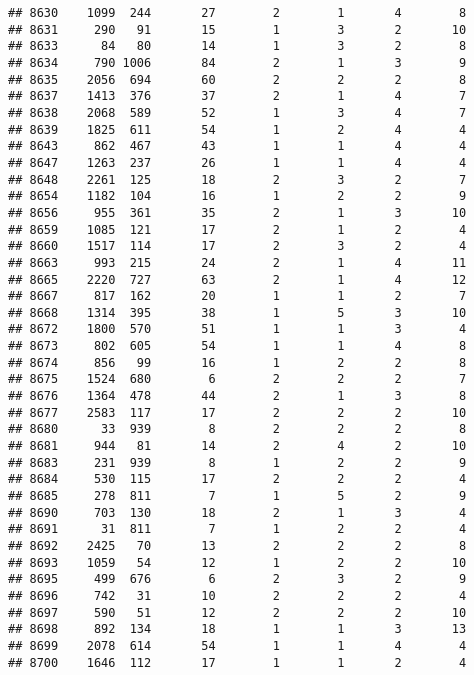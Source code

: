 \documentclass[]{article}
\begin{document}
\begin{verbatim}
## 8630    1099  244       27        2        1       4        8
## 8631     290   91       15        1        3       2       10
## 8633      84   80       14        1        3       2        8
## 8634     790 1006       84        2        1       3        9
## 8635    2056  694       60        2        2       2        8
## 8637    1413  376       37        2        1       4        7
## 8638    2068  589       52        1        3       4        7
## 8639    1825  611       54        1        2       4        4
## 8643     862  467       43        1        1       4        4
## 8647    1263  237       26        1        1       4        4
## 8648    2261  125       18        2        3       2        7
## 8654    1182  104       16        1        2       2        9
## 8656     955  361       35        2        1       3       10
## 8659    1085  121       17        2        1       2        4
## 8660    1517  114       17        2        3       2        4
## 8663     993  215       24        2        1       4       11
## 8665    2220  727       63        2        1       4       12
## 8667     817  162       20        1        1       2        7
## 8668    1314  395       38        1        5       3       10
## 8672    1800  570       51        1        1       3        4
## 8673     802  605       54        1        1       4        8
## 8674     856   99       16        1        2       2        8
## 8675    1524  680        6        2        2       2        7
## 8676    1364  478       44        2        1       3        8
## 8677    2583  117       17        2        2       2       10
## 8680      33  939        8        2        2       2        8
## 8681     944   81       14        2        4       2       10
## 8683     231  939        8        1        2       2        9
## 8684     530  115       17        2        2       2        4
## 8685     278  811        7        1        5       2        9
## 8690     703  130       18        2        1       3        4
## 8691      31  811        7        1        2       2        4
## 8692    2425   70       13        2        2       2        8
## 8693    1059   54       12        1        2       2       10
## 8695     499  676        6        2        3       2        9
## 8696     742   31       10        2        2       2        4
## 8697     590   51       12        2        2       2       10
## 8698     892  134       18        1        1       3       13
## 8699    2078  614       54        1        1       4        4
## 8700    1646  112       17        1        1       2        4

\end{verbatim}
\end{document}
